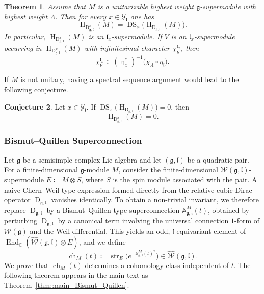 \documentclass[11pt]{amsart}
\newcommand{\str}{\operatorname{str}}
\newcommand{\DS}{\operatorname{DS}}
\newcommand{\End}{\operatorname{End}}
\newcommand{\Dirac}{\operatorname{D}}
\def\WW{{\mathcal{W}}}
\def\Weil{{\mathcal{W}(\gg)}}
\def\CC{{\mathbb C}}
\def\H{{\operatorname{H}}}
\def\ll{{\mathfrak l}}
\def\YY{{\mathcal Y}}
\def \AA {{\mathbb{A}}}
\def\gg{{\mathfrak{g}}}
\theoremstyle{plain}
\newtheorem{theorem}{Theorem}
\theoremstyle{remark}
\theoremstyle{definition}
\newtheorem{conjecture}[theorem]{Conjecture}
\numberwithin{equation}{section}
\theoremstyle{remark}
\begin{document}
\begin{theorem}\label{thm:H-Dirac-x-unitary}
Assume that $M$ is a unitarizable highest weight $\gg$-supermodule with highest weight $\Lambda$. Then for every $x\in\YY_{\ll}$ one has
\begin{equation}\label{eq:H-Dirac-x-DS}
 \H_{\Dirac^{x}_{\gg,\ll}}(M)=\DS_{x}\!\bigl(\H_{\Dirac_{\gg,\ll}}(M)\bigr).
\end{equation}
In particular, $\H_{\Dirac^{x}_{\gg,\ll}}(M)$ is an $\ll_{x}$-supermodule. If $V$ is an $\ll_{x}$-supermodule occurring in $\H_{\Dirac^{x}_{\gg,\ll}}(M)$ with infinitesimal character $\chi_{\nu}^{\ll_{x}}$, then
\begin{equation}\label{eq:inf-char-inclusion}
 \chi_{\nu}^{\ll_{x}}\in (\upeta_{x}^{\ast})^{-1}\bigl(\chi_{\Lambda}\circ \eta_{\ll}\bigr).
\end{equation}
\end{theorem}

If $M$ is not unitary, having a spectral sequence argument would lead to the following conjecture.

\begin{conjecture}
Let $x\in \YY_{\ll}$. If $\DS_{x}\bigl(\H_{\Dirac_{\gg,\ll}}(M)\bigr)=0$, then
\begin{equation*}
\H_{\Dirac^{x}_{\gg,\ll}}(M)=0.
\end{equation*}
\end{conjecture}

\subsubsection{Bismut--Quillen Superconnection} 

Let $\gg$ be a semisimple complex Lie algebra and let $(\gg,\ll)$ be a quadratic pair. For a finite-dimensional $\gg$-module $M$, consider the finite-dimensional $\WW(\gg,\ll)$-supermodule $E\coloneqq M\otimes S$, where $S$ is the spin module associated with the pair. A naive Chern–Weil-type expression formed directly from the relative cubic Dirac operator $\Dirac_{\gg,\ll}$ vanishes identically. To obtain a non-trivial invariant, we therefore replace $\Dirac_{\gg,\ll}$ by a Bismut–Quillen-type superconnection $\AA_{\gg,\ll}^{M}(t)$, obtained by perturbing $\Dirac_{\gg,\ll}$ by a canonical term involving the universal connection $1$-form of $\Weil$ and the Weil differential. This yields an odd, $\ll$-equivariant element of $\End_{\CC}(\widehat{\WW}(\gg,\ll)\otimes E)$, and we define
\begin{equation}
\operatorname{ch}_{M}(t)\coloneqq \str_{E}\!\bigl(e^{-\AA_{\gg,\ll}^{M}(t)^{2}}\bigr)\in \widehat{\WW}(\gg,\ll).
\end{equation}
We prove that $\operatorname{ch}_{M}(t)$ determines a cohomology class independent of $t$. The following theorem appears in the main text as Theorem~\ref{thm::main_Bismut_Quillen}.
\end{document}
